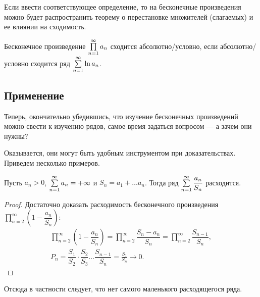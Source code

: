 \documentclass[a4paper, 12pt]{article}
\begin{document}
Если ввести соответствующее определение, то на бесконечные произведения можно будет распространить теорему о перестановке множителей (слагаемых) и ее влиянии на сходимость.

\begin{Def}
Бесконечное произведение $\prod\limits_{n=1}^{\infty} a_n$ сходится абсолютно/условно, если абсолютно/условно сходится ряд $\sum\limits_{n=1}^{\infty}\ln a_n$.
\end{Def}

\subsection{Применение}
Теперь, окончательно убедившись, что изучение бесконечных произведений можно свести к изучению рядов, самое время задаться вопросом --- а зачем они нужны?

Оказывается, они могут быть удобным инструментом при доказательствах. Приведем несколько примеров.
\begin{Statement}
Пусть $a_n > 0$, $\sum\limits_{n=1}^{\infty}a_n = +\infty$ и $S_n = a_1 + \ldots a_n$. Тогда ряд $\sum\limits_{n=1}^{\infty}\dfrac{a_n}{S_n}$ расходится.
\end{Statement}
\begin{proof}
Достаточно доказать расходимость бесконечного произведения $\prod\limits_{n=2}^{\infty} \left( 1 - \dfrac{a_n}{S_n}\right)$:
\begin{gather*}
\prod\limits_{n=2}^{\infty}\left(1 - \dfrac{a_n}{S_n} \right) = \prod\limits_{n=2}^{\infty} \dfrac{S_n - a_n}{S_n} = \prod\limits_{n=2}^{\infty} \dfrac{S_{n-1}}{S_n}, \\
P_n = \dfrac{S_1}{S_2}\cdot \dfrac{S_2}{S_3} \ldots \dfrac{S_{n-1}}{S_n} = \frac{S_1}{S_n} \to 0.
\end{gather*}
\end{proof}

Отсюда в частности следует, что нет самого маленького расходящегося ряда.
\end{document}
